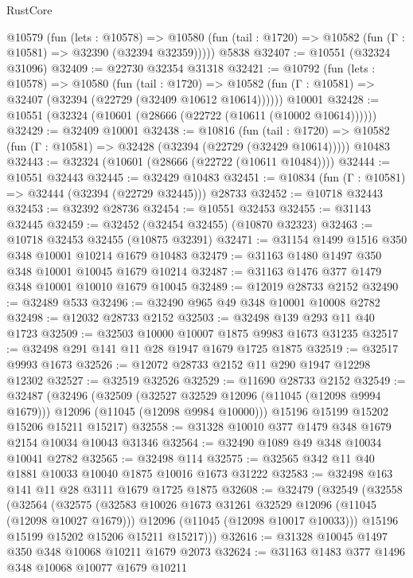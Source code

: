 \begin{lexlean}{RustCore}
\begin{coremodule}
    @10579
      (fun (lets : @10578) =>
      @10580 (fun (tail : @1720) => @10582 (fun (Γ : @10581) => @32390 (@32394 @32359)))))
    @5838
@32407 := @10551 (@32324 @31096)
@32409 := @22730 @32354 @31318
@32421 := @10792
    (fun (lets : @10578) =>
    @10580
      (fun (tail : @1720) =>
      @10582 (fun (Γ : @10581) => @32407 (@32394 (@22729 (@32409 @10612 @10614))))))
    @10001
@32428 := @10551 (@32324 (@10601 (@28666 (@22722 (@10611 (@10002 @10614))))))
@32429 := @32409 @10001
@32438 := @10816
    (fun (tail : @1720) => @10582 (fun (Γ : @10581) => @32428 (@32394 (@22729 (@32429 @10614)))))
    @10483
@32443 := @32324 (@10601 (@28666 (@22722 (@10611 @10484))))
@32444 := @10551 @32443
@32445 := @32429 @10483
@32451 := @10834 (fun (Γ : @10581) => @32444 (@32394 (@22729 @32445))) @28733
@32452 := @10718 @32443
@32453 := @32392 @28736
@32454 := @10551 @32453
@32455 := @31143 @32445
@32459 := @32452 (@32454 @32455) (@10870 @32323)
@32463 := @10718 @32453 @32455 (@10875 @32391)
@32471 := @31154 @1499 @1516 @350 @348 @10001 @10214 @1679 @10483
@32479 := @31163 @1480 @1497 @350 @348 @10001 @10045 @1679 @10214
@32487 := @31163 @1476 @377 @1479 @348 @10001 @10010 @1679 @10045
@32489 := @12019 @28733 @2152
@32490 := @32489 @533
@32496 := @32490 @965 @49 @348 @10001 @10008 @2782
@32498 := @12032 @28733 @2152
@32503 := @32498 @139 @293 @11 @40 @1723
@32509 := @32503 @10000 @10007 @1875 @9983 @1673 @31235
@32517 := @32498 @291 @141 @11 @28 @1947 @1679 @1725 @1875
@32519 := @32517 @9993 @1673
@32526 := @12072 @28733 @2152 @11 @290 @1947 @12298 @12302
@32527 := @32519 @32526
@32529 := @11690 @28733 @2152
@32549 := @32487
    (@32496
      (@32509
        (@32527 @32529 @12096 (@11045 (@12098 @9994 @1679)))
        @12096
        (@11045 (@12098 @9984 @10000)))
      @15196
      @15199
      @15202
      @15206
      @15211
      @15217)
@32558 := @31328 @10010 @377 @1479 @348 @1679 @2154 @10034 @10043 @31346
@32564 := @32490 @1089 @49 @348 @10034 @10041 @2782
@32565 := @32498 @114
@32575 := @32565 @342 @11 @40 @1881 @10033 @10040 @1875 @10016 @1673 @31222
@32583 := @32498 @163 @141 @11 @28 @3111 @1679 @1725 @1875
@32608 := @32479
    (@32549
      (@32558
        (@32564
          (@32575
            (@32583 @10026 @1673 @31261 @32529 @12096 (@11045 (@12098 @10027 @1679)))
            @12096
            (@11045 (@12098 @10017 @10033)))
          @15196
          @15199
          @15202
          @15206
          @15211
          @15217)))
@32616 := @31328 @10045 @1497 @350 @348 @10068 @10211 @1679 @2073
@32624 := @31163 @1483 @377 @1496 @348 @10068 @10077 @1679 @10211

\end{coremodule}
\end{lexlean}
